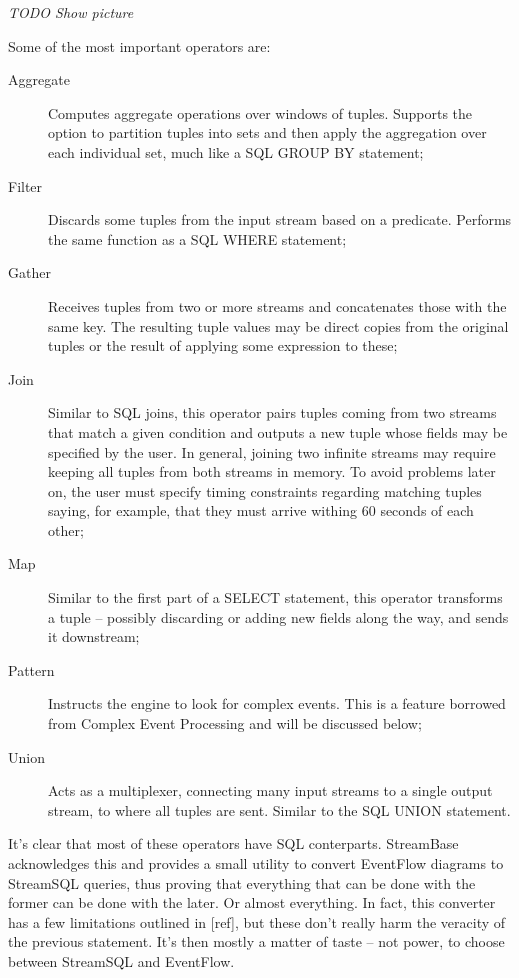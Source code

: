\documentclass{report}
\begin{document}
\emph{TODO Show picture}

Some of the most important operators are:

\begin{description}
\item [Aggregate] Computes aggregate operations over windows of tuples. Supports the option to partition tuples into sets and then apply the aggregation over each individual set, much like a SQL GROUP BY statement;
\item [Filter] Discards some tuples from the input stream based on a predicate. Performs the same function as a SQL WHERE statement;
\item [Gather] Receives tuples from two or more streams and concatenates those with the same key. The resulting tuple values may be direct copies from the original tuples or the result of applying some expression to these;
\item [Join] Similar to SQL joins, this operator pairs tuples coming from two streams that match a given condition and outputs a new tuple whose fields may be specified by the user. In general, joining two infinite streams may require keeping all tuples from both streams in memory. To avoid problems later on, the user must specify timing constraints regarding matching tuples saying, for example, that they must arrive withing 60 seconds of each other;
\item [Map] Similar to the first part of a SELECT statement, this operator transforms a tuple -- possibly discarding or adding new fields along the way, and sends it downstream;
\item [Pattern] Instructs the engine to look for complex events. This is a feature borrowed from Complex Event Processing and will be discussed below;
\item [Union] Acts as a multiplexer, connecting many input streams to a single output stream, to where all tuples are sent. Similar to the SQL UNION statement.
\end{description}

It's clear that most of these operators have SQL conterparts. StreamBase acknowledges this and provides a small utility to convert EventFlow diagrams to StreamSQL queries, thus proving that everything that can be done with the former can be done with the later. Or almost everything. In fact, this converter has a few limitations outlined in [ref], but these don't really harm the veracity of the previous statement. It's then mostly a matter of taste -- not power, to choose between StreamSQL and EventFlow.
\end{document}

